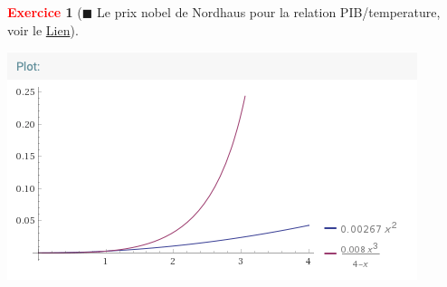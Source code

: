 \documentclass[11pt]{article}
\theoremstyle{mythmstyle}
\newtheorem{exo}{\textcolor{red}{\textbf{Exercice}}}
\begin{document}
\begin{exo}[$\blacksquare$ Le prix nobel de Nordhaus pour la relation PIB/temperature, voir le \href{https://www.youtube.com/watch?v=vwwvZ8g5eHE}{Lien}]
\begin{enumerate}
\begin{solution}

    \begin{center}
        \includegraphics[scale=0.8]{nordhausfunctioncorrected.png}
    \end{center}
\end{solution}


\end{enumerate}





\end{exo}
\end{document}
